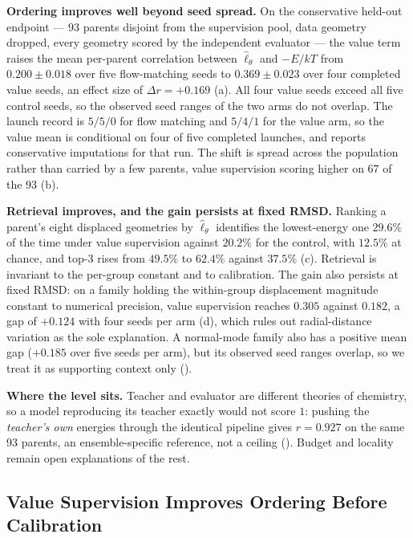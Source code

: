 \textbf{Ordering improves well beyond seed spread.} On the conservative held-out endpoint ---
$93$ parents disjoint from the supervision pool, data geometry dropped, every geometry scored by the
independent evaluator --- the value term raises the mean per-parent correlation between
$\widehat{\ell}_\theta$ and $-E/kT$ from $0.200 \pm 0.018$ over five flow-matching seeds to
$0.369 \pm 0.023$ over four completed value seeds, an effect size of $\Delta r = +0.169$
(a). All four value seeds exceed all five control seeds, so the observed seed
ranges of the two arms do not overlap. The launch record is $5/5/0$ for flow matching and $5/4/1$
for the value arm, so the value mean is conditional on four of five completed launches, and
 reports conservative imputations for that run. The shift is spread across
the population rather than carried by a few parents, value supervision scoring higher on $67$ of the
$93$ (b).

\textbf{Retrieval improves, and the gain persists at fixed RMSD.} Ranking a parent's eight
displaced geometries by $\widehat{\ell}_\theta$ identifies the lowest-energy one $29.6\%$ of
the time under value supervision against $20.2\%$ for the control, with $12.5\%$ at chance, and
top-3 rises from $49.5\%$ to $62.4\%$ against $37.5\%$ (c). Retrieval is
invariant to the per-group constant and to calibration. The gain also persists at fixed RMSD: on a family
holding the within-group displacement magnitude constant to numerical precision, value supervision
reaches $0.305$ against $0.182$, a gap of $+0.124$ with four seeds per arm (d),
which rules out radial-distance variation as the sole explanation. A normal-mode family also has a
positive mean gap ($+0.185$ over five seeds per arm), but its observed seed ranges overlap, so we
treat it as supporting context only ().



\textbf{Where the level sits.} Teacher and evaluator are different theories of chemistry, so a model
reproducing its teacher exactly would not score $1$: pushing the \emph{teacher's own} energies
through the identical pipeline gives $r = 0.927$ on the same 93 parents, an ensemble-specific
reference, not a ceiling (). Budget and locality remain open explanations of the
rest.

\subsection{Value Supervision Improves Ordering Before Calibration}
\label{sec:scale}

